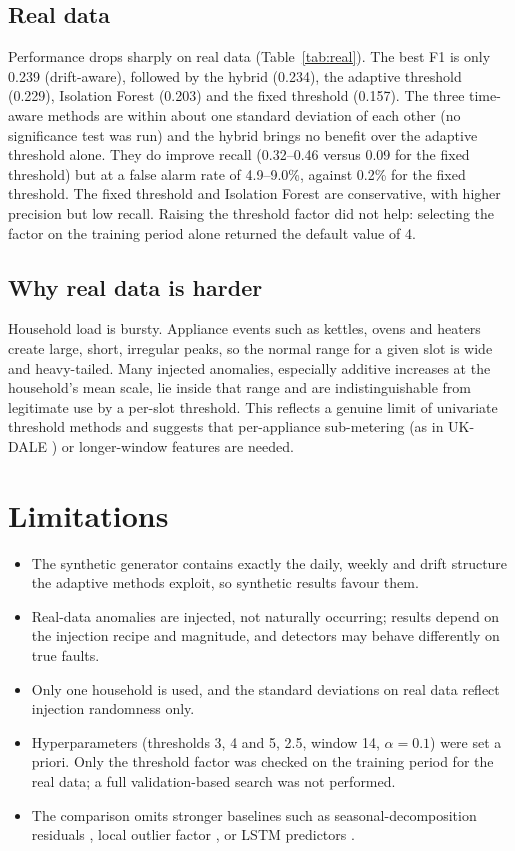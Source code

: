 \documentclass[conference]{IEEEtran}
\begin{document}
\subsection{Real data}
Performance drops sharply on real data (Table~\ref{tab:real}). The best F1 is only 0.239 (drift-aware), followed by the hybrid (0.234), the adaptive threshold (0.229), Isolation Forest (0.203) and the fixed threshold (0.157). The three time-aware methods are within about one standard deviation of each other (no significance test was run) and the hybrid brings no benefit over the adaptive threshold alone. They do improve recall (0.32--0.46 versus 0.09 for the fixed threshold) but at a false alarm rate of 4.9--9.0\%, against 0.2\% for the fixed threshold. The fixed threshold and Isolation Forest are conservative, with higher precision but low recall. Raising the threshold factor did not help: selecting the factor on the training period alone returned the default value of 4.

\subsection{Why real data is harder}
Household load is bursty. Appliance events such as kettles, ovens and heaters create large, short, irregular peaks, so the normal range for a given slot is wide and heavy-tailed. Many injected anomalies, especially additive increases at the household's mean scale, lie inside that range and are indistinguishable from legitimate use by a per-slot threshold. This reflects a genuine limit of univariate threshold methods and suggests that per-appliance sub-metering (as in UK-DALE \cite{kelly2015}) or longer-window features are needed.

\section{Limitations}
\begin{itemize}
\item The synthetic generator contains exactly the daily, weekly and drift structure the adaptive methods exploit, so synthetic results favour them.
\item Real-data anomalies are injected, not naturally occurring; results depend on the injection recipe and magnitude, and detectors may behave differently on true faults.
\item Only one household is used, and the standard deviations on real data reflect injection randomness only.
\item Hyperparameters (thresholds 3, 4 and 5, 2.5, window 14, $\alpha=0.1$) were set a priori. Only the threshold factor was checked on the training period for the real data; a full validation-based search was not performed.
\item The comparison omits stronger baselines such as seasonal-decomposition residuals \cite{cleveland1990,hochenbaum2017}, local outlier factor \cite{breunig2000}, or LSTM predictors \cite{malhotra2015}.
\end{itemize}
\end{document}
